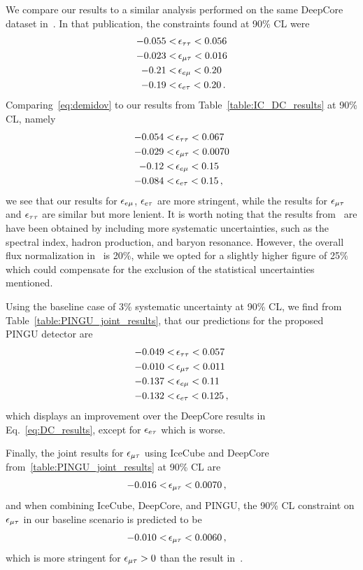{{We compare our results to a similar analysis performed on the same DeepCore dataset in~\cite{demidov}. In that publication, 
the constraints found at 90\% CL were 
\begin{align}\label{eq:demidov}
   -0.055 <&\, \epsilon_{\tau\tau} < 0.056 \nonumber \\
   -0.023 <&\, \epsilon_{\mu\tau} < 0.016 \nonumber \\
   -0.21 <&\, \epsilon_{e\mu} < 0.20 \nonumber \\
   -0.19 <&\, \epsilon_{e\tau} < 0.20\,.
\end{align}
Comparing~\ref{eq:demidov} to our results from Table~\ref{table:IC_DC_results} at 90\% CL, namely
\begin{align}\label{eq:DC_results}
   -0.054 <&\, \epsilon_{\tau\tau} < 0.067 \nonumber \\
   -0.029 <&\, \epsilon_{\mu\tau} < 0.0070 \nonumber \\
   -0.12 <&\, \epsilon_{e\mu} < 0.15 \nonumber \\
   -0.084 <&\, \epsilon_{e\tau} < 0.15\,,
\end{align}
we see that our results for $\epsilon_{e\mu}$, $\epsilon_{e\tau}$ are more stringent, while the results for $\epsilon_{\mu\tau}$ and $\epsilon_{\tau\tau}$ are similar but more lenient. It is worth noting that the 
results from~\cite{demidov} are have been obtained by including more systematic uncertainties, such as the spectral index, hadron production, and baryon resonance. 
However, the overall flux normalization in~\cite{demidov} is 20\%, while we opted for a slightly higher figure of 25\% which could compensate for the exclusion of the 
statistical uncertainties mentioned.

Using the baseline case of 3\% systematic uncertainty at 90\% CL, we find from Table~\ref{table:PINGU_joint_results}, that our predictions for the proposed PINGU detector are
\begin{align}\label{eq:P_results}
   -0.049 <&\, \epsilon_{\tau\tau} < 0.057 \nonumber \\
   -0.010 <&\, \epsilon_{\mu\tau} < 0.011 \nonumber \\
   -0.137 <&\, \epsilon_{e\mu} < 0.11 \nonumber \\
   -0.132 <&\, \epsilon_{e\tau} < 0.125\,,
\end{align}
which displays an improvement over the DeepCore results in Eq.~\ref{eq:DC_results}, except for $\epsilon_{e\tau}$ which is worse.

Finally, the joint results for $\epsilon_{\mu\tau}$ using IceCube and DeepCore from~\ref{table:PINGU_joint_results} at 90\% CL are
\begin{align}\label{eq:ID_result}
   -0.016 <&\, \epsilon_{\mu\tau} < 0.0070\,,
\end{align}
and when combining IceCube, DeepCore, and PINGU, the 90\% CL constraint on $\epsilon_{\mu\tau}$ in our baseline scenario is predicted to be
\begin{align}\label{eq:PID_result}
   -0.010 <&\, \epsilon_{\mu\tau} < 0.0060\,,
\end{align}
which is more stringent for $\epsilon_{\mu\tau}>0$ than the result in~\cite{deepcoreNSI}.

}}
